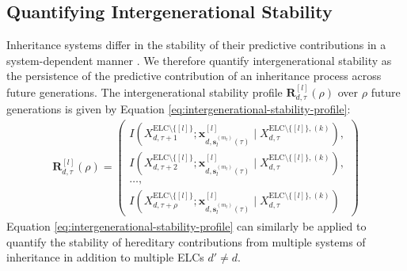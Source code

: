 \documentclass[pdflatex,sn-mathphys-num]{sn-jnl}
\theoremstyle{thmstylethree}
\theoremstyle{thmstyleone}
\newcommand{\ELC}{\mathrm{ELC}}
\begin{document}
\subsection{Quantifying Intergenerational Stability}
Inheritance systems differ in the stability of their predictive contributions in a system-dependent manner \cite{heard2014transgenerational, quadrana2016plant}. We therefore quantify intergenerational stability as the persistence of the predictive contribution of an inheritance process across future generations. The intergenerational stability profile $\mathbf{R}^{[l]}_{d,\tau}(\rho)$ over $\rho$ future generations is given by Equation \eqref{eq:intergenerational-stability-profile}:
\begin{align}
\label{eq:intergenerational-stability-profile}
\mathbf{R}^{[l]}_{d,\tau}(\rho)
=
\left(
\begin{array}{l}
I\!\left(
X^{\ELC\setminus\{[l]\}}_{d,\tau+1};
\mathbf{x}^{[l]}_{d,\mathbf{s}_{l}^{(m_l)}(\tau)}
\mid
X^{\ELC\setminus\{[l]\},(k)}_{d,\tau}
\right),
\\[0.8em]
I\!\left(
X^{\ELC\setminus\{[l]\}}_{d,\tau+2};
\mathbf{x}^{[l]}_{d,\mathbf{s}_{l}^{(m_l)}(\tau)}
\mid
X^{\ELC\setminus\{[l]\},(k)}_{d,\tau}
\right),
\\[0.8em]
\ldots,
\\[0.8em]
I\!\left(
X^{\ELC\setminus\{[l]\}}_{d,\tau+\rho};
\mathbf{x}^{[l]}_{d,\mathbf{s}_{l}^{(m_l)}(\tau)}
\mid
X^{\ELC\setminus\{[l]\},(k)}_{d,\tau}
\right)
\end{array}
\right)
\end{align}
Equation \eqref{eq:intergenerational-stability-profile} can similarly be applied to quantify the stability of hereditary contributions from multiple systems of inheritance in addition to multiple ELCs $d' \neq d$.
\end{document}
